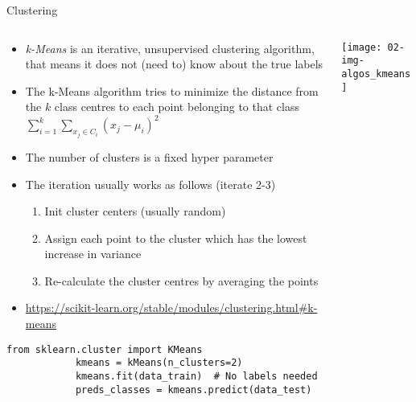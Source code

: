  \begin{frame}[fragile]{Clustering}
    \begin{columns}
      \begin{column}{0.65\textwidth}
        \begin{itemize}
          \item \emph{k-Means} is an iterative, unsupervised clustering algorithm, that means it does not (need to) know about the true labels
          \item The k-Means algorithm tries to minimize the distance from the $k$ class centres to each point belonging to that class $\sum_{i=1}^k \sum_{x_j\in C_i} (x_j - \mu_i)^2$
          \item The number of clusters is a fixed hyper parameter
          \item The iteration usually works as follows (iterate 2-3)
          \begin{enumerate}
            \item Init cluster centers (usually random)
            \item Assign each point to the cluster which has the lowest increase in variance
            \item Re-calculate the cluster centres by averaging the points
          \end{enumerate}
          \item \small\url{https://scikit-learn.org/stable/modules/clustering.html#k-means}
        \end{itemize}
        \vspace{-1em}
        \begin{mdframed}
          \begin{lstlisting}[style=dark, gobble=10, title=\lsttitlelight{Decision Tree regression [Note: example shortened]}]
            from sklearn.cluster import KMeans
            kmeans = kMeans(n_clusters=2)
            kmeans.fit(data_train)  # No labels needed
            preds_classes = kmeans.predict(data_test)
          \end{lstlisting}
        \end{mdframed}
      \end{column}
      \begin{column}{0.35\textwidth}
        \vspace{1em}

        \texttt{[image: 02-img-algos\_kmeans]}
      \end{column}
    \end{columns}
  \end{frame}

